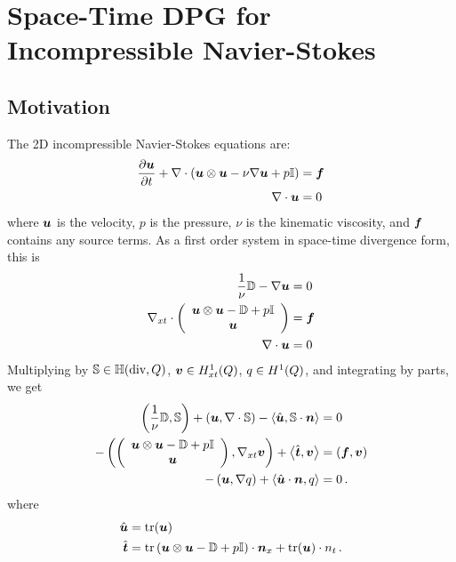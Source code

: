 \documentclass[Dissertation.tex]{subbIles}
\begin{document}
\graphicspath{{../Figures/}}
\chapter{Space-Time DPG for Incompressible Navier-Stokes}
\section{Motivation}
The 2D incompressible Navier-Stokes equations are:
\begin{align*}
  \pd{\bfu}{t}+\Div\LRp{\bfu\otimes\bfu-\nu\Grad\bfu+p\bbI}&=\bff\\
  \Div\bfu&=0
\end{align*}
where $\bfu$ is the velocity, $p$ is the pressure, $\nu$ is the kinematic viscosity,
and $\bff$ contains any source terms.
As a first order system in space-time divergence form, this is
\begin{align*}
  \frac{1}{\nu}\bbD-\Grad\bfu&=0\\
  \Divxt\vecttwo{\bfu\otimes\bfu-\bbD+p\bbI}{\bfu}&=\bff\\
  \Div\bfu&=0
\end{align*}
Multiplying by $\bbS\in\bbH(\text{div},Q)$, $\bfv\in\HonextQ$, $q\in\HonexQ$, and integrating by
parts, we get
\begin{align*}
  \LRp{\frac{1}{\nu}\bbD,\bbS}
  +\LRp{\bfu,\Div\bbS}
  -\LRa{\hat\bfu,\bbS\cdot\bfn}&=0\\
  -\LRp{\vecttwo{\bfu\otimes\bfu-\bbD+p\bbI}{\bfu},\Gradxt\bfv}
  +\LRa{\hat\bft,\bfv}
  &=(\bff,\bfv)\\
  -\LRp{\bfu,\Grad q}
  +\LRa{\hat{\bfu}\cdot\bfn,q}&=0\,.
\end{align*}
where
\begin{align*}
\hat\bfu&=\trace(\bfu)\\
\hat\bft&=\trace\LRp{\bfu\otimes\bfu-\bbD+p\bbI}\cdot\bfn_x
+\trace(\bfu)\cdot n_t\,.
\end{align*}
\end{document}
